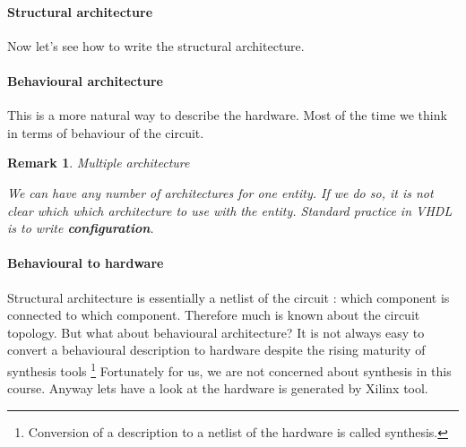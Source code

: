 \documentclass[a4paper,10pt]{article}
\newtheorem{remark}{Remark}
\begin{document}
\paragraph{Structural architecture} Now let's see how to write the structural
architecture.

  

  \paragraph{Behavioural architecture}

  This is a more natural way to describe the hardware. Most of the time we think
  in terms of behaviour of the circuit. 
 
  


  \begin{remark}{Multiple architecture}
    
    We can have any number of architectures for one entity. If we do so, it is
    not clear which which architecture to use with the entity. Standard practice
    in VHDL is to write \textbf{configuration}.
 
  \end{remark}

  \paragraph{Behavioural to hardware}
    
  Structural architecture is essentially a netlist of the circuit : which
  component is connected to which component. Therefore much is known about the
  circuit topology. But what about behavioural architecture? It is not always
  easy to convert a behavioural description to hardware despite the rising
  maturity of synthesis tools \footnote{Conversion of a description to a netlist
  of the hardware is called synthesis.} Fortunately for us, we are not concerned
  about synthesis in this course.  Anyway lets have a look at the hardware is
  generated by Xilinx tool.
\end{document}
